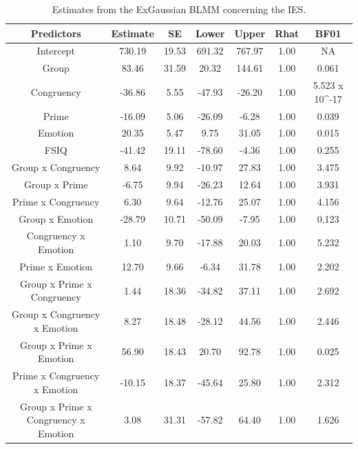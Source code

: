 \documentclass[
  11pt,
  english,
  ,doc,floatsintext]{apa6}
\begin{document}
\begin{table}[htb]

\begin{center}
\begin{threeparttable}

\caption{\label{tab:summaryIBMf}Estimates from the ExGaussian BLMM concerning the IES.}

\small{

\begin{tabular}{ccccccc}
\toprule
Predictors & \multicolumn{1}{c}{Estimate} & \multicolumn{1}{c}{SE} & \multicolumn{1}{c}{Lower} & \multicolumn{1}{c}{Upper} & \multicolumn{1}{c}{Rhat} & \multicolumn{1}{c}{BF01}\\
\midrule
Intercept & 730.19 & 19.53 & 691.32 & 767.97 & 1.00 & NA\\
Group & 83.46 & 31.59 & 20.32 & 144.61 & 1.00 & 0.061\\
Congruency & -36.86 & 5.55 & -47.93 & -26.20 & 1.00 & 5.523 x 10\textasciicircum{}-17\\
Prime & -16.09 & 5.06 & -26.09 & -6.28 & 1.00 & 0.039\\
Emotion & 20.35 & 5.47 & 9.75 & 31.05 & 1.00 & 0.015\\
FSIQ & -41.42 & 19.11 & -78.60 & -4.36 & 1.00 & 0.255\\
Group x Congruency & 8.64 & 9.92 & -10.97 & 27.83 & 1.00 & 3.475\\
Group x Prime & -6.75 & 9.94 & -26.23 & 12.64 & 1.00 & 3.931\\
Prime x Congruency & 6.30 & 9.64 & -12.76 & 25.07 & 1.00 & 4.156\\
Group x Emotion & -28.79 & 10.71 & -50.09 & -7.95 & 1.00 & 0.123\\
Congruency x Emotion & 1.10 & 9.70 & -17.88 & 20.03 & 1.00 & 5.232\\
Prime x Emotion & 12.70 & 9.66 & -6.34 & 31.78 & 1.00 & 2.202\\
Group x Prime x Congruency & 1.44 & 18.36 & -34.82 & 37.11 & 1.00 & 2.692\\
Group x Congruency x Emotion & 8.27 & 18.48 & -28.12 & 44.56 & 1.00 & 2.446\\
Group x Prime x Emotion & 56.90 & 18.43 & 20.70 & 92.78 & 1.00 & 0.025\\
Prime x Congruency x Emotion & -10.15 & 18.37 & -45.64 & 25.80 & 1.00 & 2.312\\
Group x Prime x Congruency x Emotion & 3.08 & 31.31 & -57.82 & 64.40 & 1.00 & 1.626\\
\bottomrule
\end{tabular}

}

\end{threeparttable}
\end{center}

\end{table}
\end{document}
